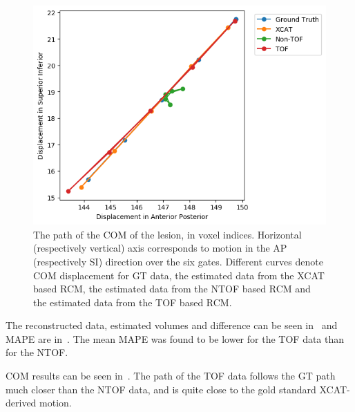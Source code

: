             \begin{figure}
                \centering
                
                \includegraphics[width=1.0\linewidth]{figures/result_1_TOF.png}
                
                \captionsetup{singlelinecheck=false, justification=raggedright}
                \caption{The path of the \gls{COM} of the lesion, in voxel indices. Horizontal (respectively vertical) axis corresponds to motion in the \gls{AP} (respectively \gls{SI}) direction over the six gates. Different curves denote \gls{COM} displacement for \gls{GT} data, the estimated data from the \gls{XCAT} based \gls{RCM}, the estimated data from the  \gls{NTOF} based \gls{RCM} and the estimated data from the  \gls{TOF} based \gls{RCM}.} \label{fig:impact_of_tof_on_respiratory_motion_model_estimation_using_pre_gated_no_intra_cycle_motion_nac_pet_results_com_graph}
            \end{figure}
            
             The reconstructed data, estimated volumes and difference can be seen in~ and \gls{MAPE} are in~. The mean \gls{MAPE} was found to be lower for the  \gls{TOF} data than for the  \gls{NTOF}.
            
             \gls{COM} results can be seen in~. The path of the  \gls{TOF} data follows the \gls{GT} path much closer than the  \gls{NTOF} data, and is quite close to the gold standard \gls{XCAT}-derived motion.
            
